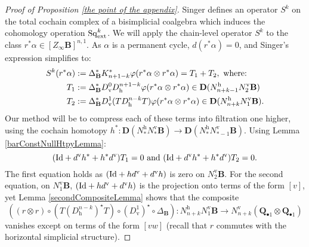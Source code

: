 \documentclass[11pt]{amsart} \renewcommand{\baselinestretch}{1.2}
\theoremstyle{plain}
\numberwithin{equation}{section} %
\theoremstyle{plain}
\numberwithin{equation}{chapter} %
\let\oldphi\phi
\let\phi\varphi
\renewcommand{\to}{\longrightarrow}
\newcommand{\DeltatubfD}{\Delta_{\mathrm{\textbf{B}}}}
\newcommand{\citeBOX}[2][]{\cite[\mbox{#1}]{#2}}
\newcommand{\Sq}{\mathrm{Sq}}
\newcommand{\EZ}[5]{[Z^{#1}_{#2}#3]^{#4}_{#5}}
\newcommand{\uver}{^\mathrm{v}}
\newcommand{\uhor}{^\mathrm{h}}
\newcommand{\dver}{_\mathrm{v}}
\newcommand{\dhor}{_\mathrm{h}}
\newcommand{\dual}{\mathbf{D}}
\begin{document}
\begin{appendices}
\begin{proof}[Proof of Proposition \ref{the point of the appendix}]
Singer \citeBOX[(2.14)]{MR2245560} defines  an operator $S^k$ on the total cochain complex of a bisimplicial coalgebra which induces the cohomology operation $\Sq^k_\textup{ext}$.
We will apply the chain-level operator $S^k$  to the class $r^*\alpha\in \EZ{}{\infty}{\textbf{B}}{n,1}{}$. As $\alpha$ is a permanent cycle, $d(r^*\alpha)=0$, and Singer's expression simplifies to:
\begin{alignat*}{2}
S^k(r^*\alpha):={}&\DeltatubfD^*K^*_{n+1-k}\oldphi(r^*\alpha\otimes r^*\alpha)=T_1+T_2,\textup{ where:}
\\
T_1
:={}&
\DeltatubfD^*D\dver^0D\dhor^{n+1-k}
\oldphi(r^*\alpha\otimes r^*\alpha)\in \dual(N\uhor_{n+k-1}N\uver_2\textbf{B})%
\\
T_2
:={}&
\DeltatubfD^*D\dver^1(TD\dhor^{n-k}T)
\oldphi(r^*\alpha\otimes r^*\alpha)\in \dual(N\uhor_{n+k}N\uver_1\textbf{B}).
\end{alignat*}
%
Our method will be to compress each of these terms into filtration one higher, using the cochain homotopy $h^*:\dual(N\uhor_* N\uver_*\textbf{B})\to \dual(N\uhor_*N\uver_{*-1}\textbf{B})$.
Using Lemma \ref{barConstNullHtpyLemma}:
\[(\textup{Id}+d\uver h^*+ h^*d\uver )T_1=0\textup{ and }(\textup{Id}+d\uver h^*+ h^*d\uver)T_2=0.\]
The first equation holds as $(\textup{Id}+hd\uver+d\uver h)$ is zero on $N\uver_2\textbf{B}$. For the second equation, on $N\uver_1\textbf{B}$,  $(\textup{Id}+hd\uver+d\uver h)$ is the projection onto terms of the form $[v]$, yet Lemma \ref{secondCompositeLemma} shows that the composite
\[((r\otimes r)\circ(T(D\dhor^{n-k})^\star T)\circ (D\dver^1)^\star\circ\DeltatubfD): N\uhor_{n+k}N\uver_1\textbf{B}\to N\uver_{n+k}(\textbf{Q}_{\bullet1}\otimes \textbf{Q}_{\bullet1})\]
vanishes except on terms of the form $[vw]$ (recall that $r$ commutes with the horizontal simplicial structure).


\end{proof}
\end{appendices}
\end{document}
